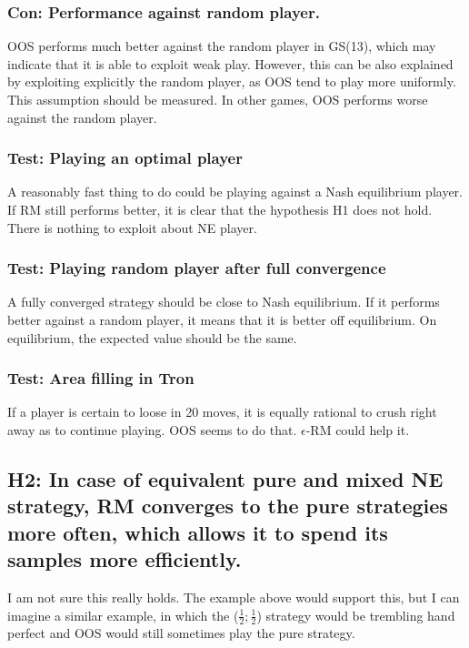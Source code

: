 \documentclass[preprint,12pt]{elsarticle}
\begin{document}
\subsubsection{Con: Performance against random player.}
OOS performs much better against the random player in GS(13), which may indicate that it is able to exploit weak play. However, this can be also explained by exploiting explicitly the random player, as OOS tend to play more uniformly. This assumption should be measured. In other games, OOS performs worse against the random player.

\subsubsection{Test: Playing an optimal player}

A reasonably fast thing to do could be playing against a Nash equilibrium player. If RM still performs better, it is clear that the hypothesis H1 does not hold. There is nothing to exploit about NE player.

\subsubsection{Test: Playing random player after full convergence}

A fully converged strategy should be close to Nash equilibrium. If it performs better against a random player, it means that it is better off equilibrium. On equilibrium, the expected value should be the same.

\subsubsection{Test: Area filling in Tron}
If a player is certain to loose in 20 moves, it is equally rational to crush right away as to continue playing. OOS seems to do that. $\epsilon$-RM could help it.


\subsection{H2: In case of equivalent pure and mixed NE strategy, RM converges to the pure strategies more often, which allows it to spend its samples more efficiently.}

I am not sure this really holds. The example above would support this, but I can imagine a similar example, in which the ($\frac{1}{2};\frac{1}{2}$) strategy would be trembling hand perfect and OOS would still sometimes play the pure strategy.
\end{document}
